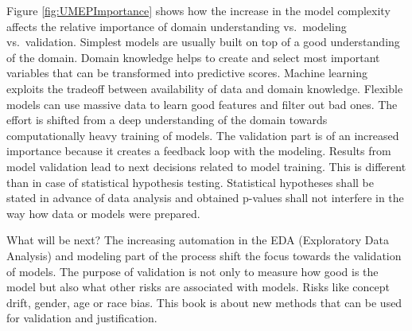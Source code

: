 \documentclass[]{krantz}
\begin{document}
Figure \ref{fig:UMEPImportance} shows how the increase in the model complexity affects the relative importance of domain understanding vs.~modeling vs.~validation. Simplest models are usually built on top of a good understanding of the domain. Domain knowledge helps to create and select most important variables that can be transformed into predictive scores. Machine learning exploits the tradeoff between availability of data and domain knowledge. Flexible models can use massive data to learn good features and filter out bad ones. The effort is shifted from a deep understanding of the domain towards computationally heavy training of models. The validation part is of an increased importance because it creates a feedback loop with the modeling. Results from model validation lead to next decisions related to model training. This is different than in case of statistical hypothesis testing. Statistical hypotheses shall be stated in advance of data analysis and obtained p-values shall not interfere in the way how data or models were prepared.

What will be next? The increasing automation in the EDA (Exploratory Data Analysis) and modeling part of the process shift the focus towards the validation of models. The purpose of validation is not only to measure how good is the model but also what other risks are associated with models. Risks like concept drift, gender, age or race bias. This book is about new methods that can be used for validation and justification.
\end{document}
